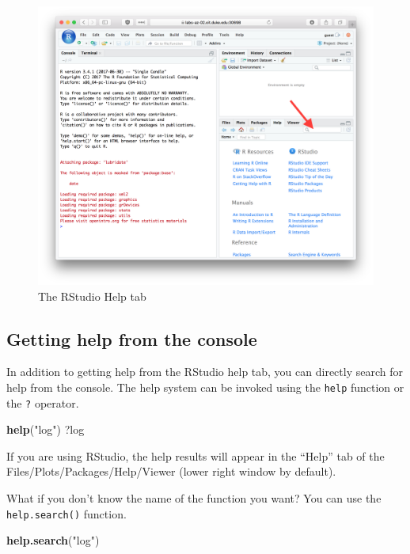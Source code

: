 \documentclass[]{book}
\newenvironment{Shaded}{\begin{snugshade}}{\end{snugshade}}
\newcommand{\KeywordTok}[1]{\textcolor[rgb]{0.13,0.29,0.53}{\textbf{#1}}}
\newcommand{\NormalTok}[1]{#1}
\newcommand{\StringTok}[1]{\textcolor[rgb]{0.31,0.60,0.02}{#1}}
\theoremstyle{definition}
\theoremstyle{definition}
\theoremstyle{definition}
\theoremstyle{remark}
\begin{document}
\begin{figure}

{\centering \includegraphics[width=0.6\linewidth]{./figures/fig-rstudio-help} 

}

\caption{The RStudio Help tab}\label{fig:unnamed-chunk-38}
\end{figure}

\hypertarget{getting-help-from-the-console}{%
\subsection{Getting help from the
console}\label{getting-help-from-the-console}}

In addition to getting help from the RStudio help tab, you can directly
search for help from the console. The help system can be invoked using
the \texttt{help} function or the \texttt{?} operator.

\begin{Shaded}
\begin{Highlighting}[]
\KeywordTok{help}\NormalTok{(}\StringTok{"log"}\NormalTok{)}
\NormalTok{?log}
\end{Highlighting}
\end{Shaded}

If you are using RStudio, the help results will appear in the ``Help''
tab of the Files/Plots/Packages/Help/Viewer (lower right window by
default).

What if you don't know the name of the function you want? You can use
the \texttt{help.search()} function.

\begin{Shaded}
\begin{Highlighting}[]
\KeywordTok{help.search}\NormalTok{(}\StringTok{"log"}\NormalTok{)}
\end{Highlighting}
\end{Shaded}
\end{document}
